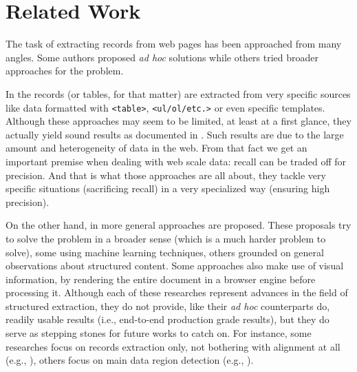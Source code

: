 \documentclass{vldb}
\begin{document}
\section{Related Work}\label{sec:work}

The task of extracting records from web pages has been approached from many
angles. Some authors proposed \textit{ad hoc} solutions while others tried 
broader approaches for the problem.

In \cite{webtables2008, listExtract2009, tablesMS2012, tegra2015, qiu2015dexter,
topklists2013} the records (or tables, for that matter) are extracted from very
specific sources like data formatted with \texttt{<table>},
\texttt{<ul/ol/etc.>} or even specific templates. Although these approaches may
seem to be limited, at least at a first glance, they actually yield sound
results as documented in \cite{relationalWeb2008, probase, probase2012, acsdb}.
Such results are due to the large amount and heterogeneity of data in the web.
From that fact we get an important premise when dealing with web scale data:
recall can be traded off for precision. And that is what those approaches are
all about, they tackle very specific situations (sacrificing recall) in a very
specialized way (ensuring high precision).

On the other hand, in \cite{RRunner01, exalg2003, vips03, viper05, MDR03,
depta05, NET05, TPC09, vide10, gstm2010, fivatech2010, cvts2012, SuffixTree12,
grigalis2013towards, datapath2015, autorm2015} more general approaches are proposed.
These proposals try to solve the problem in a broader sense (which is a much
harder problem to solve), some using machine learning
techniques\cite{RRunner01,fivatech2010,grigalis2013towards,datapath2015}, others
grounded on general observations about structured
content\cite{MDR03,exalg2003,NET05,depta05,TPC09,gstm2010,SuffixTree12,cvts2012,autorm2015}.
Some approaches also make use of visual information, by rendering the entire
document in a browser engine before processing
it\cite{vips03,viper05,depta05,vide10,grigalis2013towards}.
Although each of these researches represent advances in the field of structured
extraction, they do not provide, like their \textit{ad hoc} counterparts do,
readily usable results (i.e., end-to-end production grade results), but they do
serve as stepping stones for future works to catch on. For instance, some
researches focus on records extraction only, not bothering with alignment at all
(e.g., \cite{TPC09}), others focus on main data region detection (e.g.,
\cite{vips03}).
\end{document}
